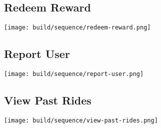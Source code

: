 \documentclass[11pt]{article}
\begin{document}
\subsection{Redeem Reward}
\texttt{[image: build/sequence/redeem-reward.png]}
\subsection{Report User}
\texttt{[image: build/sequence/report-user.png]}
\subsection{View Past Rides}
\texttt{[image: build/sequence/view-past-rides.png]}







\end{document}
